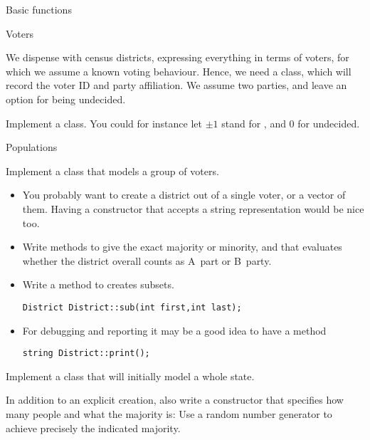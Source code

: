  {Basic functions}

 {Voters}

We dispense with census districts, expressing everything in terms of
voters, for which we assume a known voting behaviour. Hence, we need a
 class, which will record the voter ID and party
affiliation. We assume two parties, and leave an option for being undecided.

\begin{exercise}
  Implement a  class. You could for instance let $\pm1$ stand
  for , and 0 for undecided.
\end{exercise}

 {Populations}

\begin{exercise}
  Implement a  class that models a group of voters.
  \begin{itemize}
    \item You probably want to create a district out of a single
      voter, or a vector of them. Having a constructor that accepts a
      string representation would be nice too.
    \item Write methods  to give the exact majority or
      minority, and  that evaluates whether the district
      overall counts as A~part or B~party.
    \item Write a  method to creates subsets.
\begin{lstlisting}
District District::sub(int first,int last);
\end{lstlisting}
  \item For debugging and reporting it may be a good idea to have a method
\begin{lstlisting}
string District::print();
\end{lstlisting}
  \end{itemize}
\end{exercise}

\begin{exercise}
  Implement a  class that will initially model a whole state.

  In addition to an explicit creation, also write a constructor that
  specifies how many people and what the majority is:
  Use a random number generator to achieve precisely the indicated majority.
\end{exercise}

